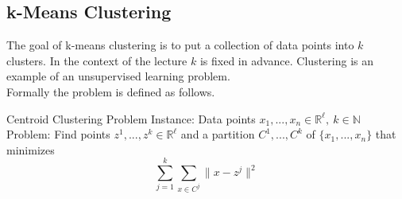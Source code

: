\documentclass{panikzettel}
\begin{document}
%
%
%

\subsection{k-Means Clustering}
The goal of k-means clustering is to put a collection of data points into $k$ clusters. In the context of the lecture $k$ is fixed in advance. Clustering is an example of an unsupervised learning problem.\\
Formally the problem is defined as follows.

\begin{defi}{Centroid Clustering Problem}
Instance: Data points $x_1,..., x_n\in\mathbb{R}^\ell, \ k\in\mathbb{N}$ \\
Problem:  Find points $z^1,...,z^k\in\mathbb{R}^\ell$ and a partition $C^1,...,C^k$ of $\{x_1,...,x_n \}$ that minimizes
\[
\sum_{j=1}^k \sum_{x\in C^j} \parallel x-z^j \parallel^2
\]
\end{defi}
\end{document}

